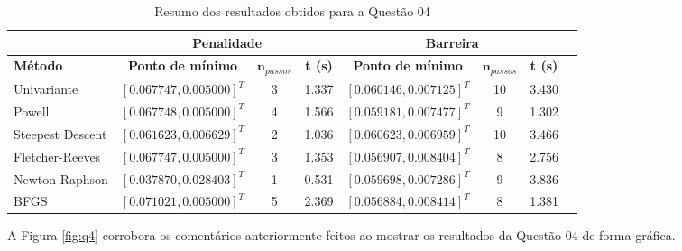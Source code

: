 \documentclass[10pt, a4paper]{article}
\begin{document}
\begin{table}[htpb]
  \centering
  \begin{tabular}{|l|c|c|c|c|c|c|c|}
    \multicolumn{1}{c}{} %
    & 
    \multicolumn{3}{c}{\textbf{Penalidade}} \vline
    & 
    \multicolumn{3}{c}{\textbf{Barreira}} \\%
    \hline%
    \textbf{Método}
    &
    \textbf{Ponto de mínimo}
    & 
    $\mathbf{n}_{passos}$
    & 
    \textbf{t (s)}
    &
    \textbf{Ponto de mínimo}
    & 
    $\mathbf{n}_{passos}$
    & 
    \textbf{t (s)}
    \\
    Univariante        & $[0.067747, 0.005000]^T$ &  3 & 1.337 &  $[0.060146, 0.007125]^T$ &  10  & 3.430    \\
    Powell             & $[0.067748, 0.005000]^T$ &  4 & 1.566 &  $[0.059181, 0.007477]^T$ &   9  & 1.302    \\
    Steepest Descent   & $[0.061623, 0.006629]^T$ &  2 & 1.036 &  $[0.060623, 0.006959]^T$ &  10  & 3.466    \\
    Fletcher-Reeves    & $[0.067747, 0.005000]^T$ &  3 & 1.353 &  $[0.056907, 0.008404]^T$ &   8  & 2.756    \\
    Newton-Raphson     & $[0.037870, 0.028403]^T$ &  1 & 0.531 &  $[0.059698, 0.007286]^T$ &   9  & 3.836    \\
    BFGS               & $[0.071021, 0.005000]^T$ &  5 & 2.369 &  $[0.056884, 0.008414]^T$ &   8  & 1.381    \\
    \hline
  \end{tabular}
  \caption{Resumo dos resultados obtidos para a Questão 04}
  \label{tab:q4_results}
\end{table}

A Figura \ref{fig:q4} corrobora os comentários anteriormente feitos ao mostrar os resultados da Questão 04 de forma gráfica.
\end{document}
